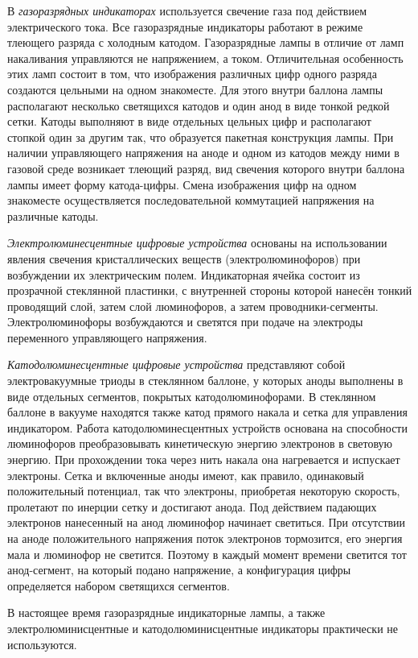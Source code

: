 В \textit{газоразрядных индикаторах} используется свечение газа под действием электрического тока. Все газоразрядные индикаторы работают в режиме тлеющего разряда с холодным катодом. Газоразрядные лампы в отличие от ламп накаливания управляются не напряжением, а током. Отличительная особенность этих ламп состоит в том, что изображения различных цифр одного разряда создаются цельными на одном знакоместе. Для этого внутри баллона лампы располагают несколько светящихся катодов и один анод в виде тонкой редкой сетки. Катоды выполняют в виде отдельных цельных цифр и располагают стопкой один за другим так, что образуется пакетная конструкция лампы. При наличии управляющего напряжения на аноде и одном из катодов между ними в газовой среде возникает тлеющий разряд, вид свечения которого внутри баллона лампы имеет форму катода-цифры. Смена изображения цифр на одном знакоместе осуществляется последовательной коммутацией напряжения на различные катоды.

\textit{Электролюминесцентные цифровые устройства} основаны на использовании явления свечения кристаллических веществ (электролюминофоров) при возбуждении их электрическим полем. Индикаторная ячейка состоит из прозрачной стеклянной пластинки, с внутренней стороны которой нанесён тонкий проводящий слой, затем слой люминофоров, а затем проводники-сегменты. Электролюминофоры возбуждаются и светятся при подаче на электроды переменного управляющего напряжения.

\textit{Катодолюминесцентные цифровые устройства} представляют собой электровакуумные триоды в стеклянном баллоне, у которых аноды выполнены в виде отдельных сегментов, покрытых катодолюминофорами. В стеклянном баллоне в вакууме находятся также катод прямого накала и сетка для управления индикатором. Работа катодолюминесцентных устройств основана на способности люминофоров преобразовывать кинетическую энергию электронов в световую энергию. При прохождении тока через нить накала она нагревается и испускает электроны. Сетка и включенные аноды имеют, как правило, одинаковый положительный потенциал, так что электроны, приобретая некоторую скорость, пролетают по инерции сетку и достигают анода. Под действием падающих электронов нанесенный на анод люминофор начинает светиться. При отсутствии на аноде положительного напряжения поток электронов тормозится, его энергия мала и люминофор не светится. Поэтому в каждый момент времени светится тот анод-сегмент, на который подано напряжение, а конфигурация цифры определяется набором светящихся сегментов.

В настоящее время газоразрядные индикаторные лампы, а также электролюминисцентные и катодолюминисцентные индикаторы практически не используются.

